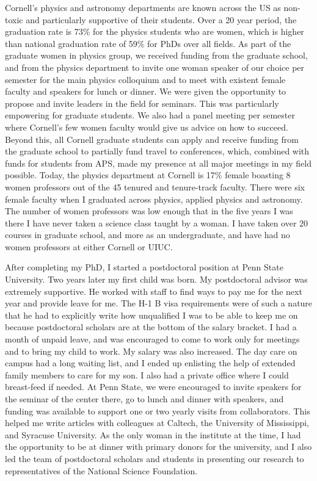 \documentclass[utf8]{frontiersSCNS} %
\begin{document}
Cornell's physics and astronomy departments are known across the US as non-toxic and particularly supportive of their students. Over a 20 year period, the graduation rate is 73\% for the physics students who are women, which is higher than national graduation rate of 59\% for PhDs over all fields. As part of the graduate women in physics group, we received funding from the graduate school, and from the physics department to invite one woman speaker of our choice per semester for the main physics colloquium and to meet with existent female faculty and speakers for lunch or dinner. We were given the opportunity to propose and invite leaders in the field for seminars. This was particularly empowering for graduate students. We also had a panel meeting per semester where Cornell's few women faculty would give us advice on how to succeed.  Beyond this, all Cornell graduate students can apply and receive funding from the graduate school to partially fund travel to conferences, which, combined with funds for students from APS, made my presence at all major meetings in my field possible. Today, the physics department at Cornell is 17\% female boasting 8 women professors out of the 45 tenured and tenure-track faculty. There were six female faculty when I graduated across physics, applied physics and astronomy. The number of women professors was low enough that in the five years I was there I have never taken a science class taught by a woman. I have taken over 20 courses in graduate school, and more as an undergraduate, and have had no women professors at either Cornell or UIUC. 

After completing my PhD, I started a postdoctoral position at Penn State University. Two years later my first child was born. My postdoctoral advisor was extremely supportive. He worked with staff to find ways to pay me for the next year and provide leave for me. The H-1 B visa requirements were of such a nature that he had to explicitly write how unqualified I was to be able to keep me on because postdoctoral scholars are at the bottom of the salary bracket. I had a month of unpaid leave, and was encouraged to come to work only for meetings and to bring my child to work. My salary was also increased. The day care on campus had a long waiting list, and I ended up enlisting the help of extended family members to care for my son. I also had a private office where I could breast-feed if needed. At Penn State, we were encouraged to invite speakers for the seminar of the center there, go to lunch and dinner with speakers, and funding was available to support one or two yearly visits from collaborators. This helped me write articles with colleagues at Caltech, the University of Mississippi, and Syracuse University. As the only woman in the institute at the time, I had the opportunity to be at dinner with primary donors for the university, and I also led the team of postdoctoral scholars and students in presenting our research to representatives of the National Science Foundation.
\end{document}

